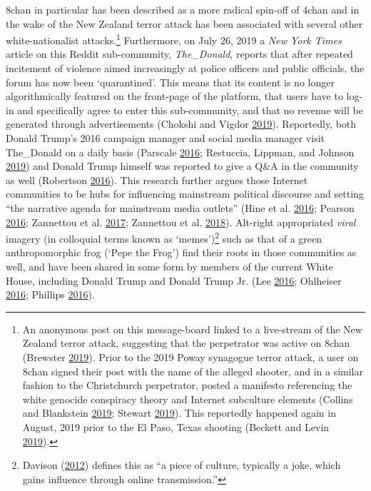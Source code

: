 \documentclass[10pt,british,A4paper,oneside]{memoir}
\begin{document}
8chan in particular has been described as a more radical spin-off of
4chan and in the wake of the New Zealand terror attack has been
associated with several other white-nationalist attacks.\footnote{An
  anonymous post on this message-board linked to a live-stream of the
  New Zealand terror attack, suggesting that the perpetrator was active
  on 8chan (Brewster \protect\hyperlink{ref-brewster_after_2019}{2019}).
  Prior to the 2019 Poway synagogue terror attack, a user on 8chan
  signed their post with the name of the alleged shooter, and in a
  similar fashion to the Christchurch perpetrator, posted a manifesto
  referencing the white genocide conspiracy theory and Internet
  subculture elements (Collins and Blankstein
  \protect\hyperlink{ref-collins_anti-semitic_2019}{2019}; Stewart
  \protect\hyperlink{ref-stewart_8chan_2019}{2019}). This reportedly
  happened again in August, 2019 prior to the El Paso, Texas shooting
  (Beckett and Levin \protect\hyperlink{ref-beckett_paso_2019}{2019}).}
Furthermore, on July 26, 2019 a \emph{New York Times} article on this
Reddit sub-community, \emph{The\_Donald}, reports that after repeated
incitement of violence aimed increasingly at police officers and public
officials, the forum has now been `quarantined'. This means that its
content is no longer algorithmically featured on the front-page of the
platform, that users have to log-in and specifically agree to enter this
sub-community, and that no revenue will be generated through
advertisements (Chokshi and Vigdor
\protect\hyperlink{ref-chokshi_reddit_2019}{2019}). Reportedly, both
Donald Trump's 2016 campaign manager and social media manager visit
The\_Donald on a daily basis (Parscale
\protect\hyperlink{ref-parscale_reddit_2016}{2016}; Restuccia, Lippman,
and Johnson \protect\hyperlink{ref-restuccia_get_2019}{2019}) and Donald
Trump himself was reported to give a Q\&A in the community as well
(Robertson \protect\hyperlink{ref-robertson_donald_2016}{2016}). This
research further argues those Internet communities to be hubs for
influencing mainstream political discourse and setting ``the narrative
agenda for mainstream media outlets'' (Hine et al.
\protect\hyperlink{ref-hine_kek_2016}{2016}; Pearson
\protect\hyperlink{ref-pearson_scientists_2016}{2016}; Zannettou et al.
\protect\hyperlink{ref-zannettou_web_2017}{2017}; Zannettou et al.
\protect\hyperlink{ref-zannettou_origins_2018}{2018}). Alt-right
appropriated \emph{viral} imagery (in colloquial terms known as
`memes')\footnote{Davison
  (\protect\hyperlink{ref-davison_language_2012}{2012}) defines this as
  ``a piece of culture, typically a joke, which gains influence through
  online transmission.''} such as that of a green anthropomorphic frog
(`Pepe the Frog') find their roots in those communities as well, and
have been shared in some form by members of the current White House,
including Donald Trump and Donald Trump Jr. (Lee
\protect\hyperlink{ref-lee_understanding_2016}{2016}; Ohlheiser
\protect\hyperlink{ref-ohlheiser_analysis_2016}{2016}; Phillips
\protect\hyperlink{ref-phillips_alt-right_2016}{2016}).
\end{document}
